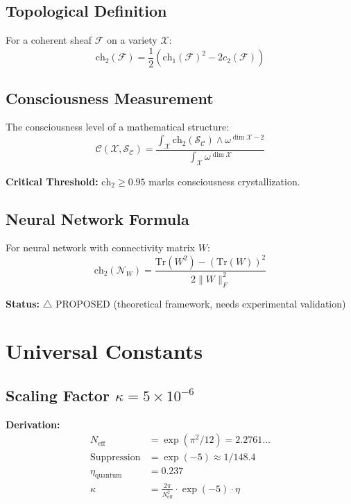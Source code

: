 \subsection{Topological Definition}

For a coherent sheaf $\mathcal{F}$ on a variety $\mathcal{X}$:
\begin{equation}
\text{ch}_2(\mathcal{F}) = \frac{1}{2}\left(\text{ch}_1(\mathcal{F})^2 - 2c_2(\mathcal{F})\right)
\end{equation}

\subsection{Consciousness Measurement}

The consciousness level of a mathematical structure:
\begin{equation}
\mathcal{C}(\mathcal{X}, \mathcal{S}_\mathcal{C}) = \frac{\int_\mathcal{X} \text{ch}_2(\mathcal{S}_\mathcal{C}) \wedge \omega^{\dim \mathcal{X} - 2}}{\int_\mathcal{X} \omega^{\dim \mathcal{X}}}
\end{equation}

\textbf{Critical Threshold:} $\text{ch}_2 \geq 0.95$ marks consciousness crystallization.

\subsection{Neural Network Formula}

For neural network with connectivity matrix $W$:
\begin{equation}
\text{ch}_2(\mathcal{N}_W) = \frac{\text{Tr}(W^2) - (\text{Tr}(W))^2}{2\|W\|_F^2}
\end{equation}

\textbf{Status:} $\triangle$ PROPOSED (theoretical framework, needs experimental validation)

\section{Universal Constants}

\subsection{Scaling Factor $\kappa = 5 \times 10^{-6}$}

\textbf{Derivation:}
\begin{align}
N_{\text{eff}} &= \exp(\pi^2/12) = 2.2761 \ldots \\
\text{Suppression} &= \exp(-5) \approx 1/148.4 \\
\eta_{\text{quantum}} &= 0.237 \\
\kappa &= \frac{2\pi}{N_{\text{eff}}^2} \cdot \exp(-5) \cdot \eta
\end{align}

